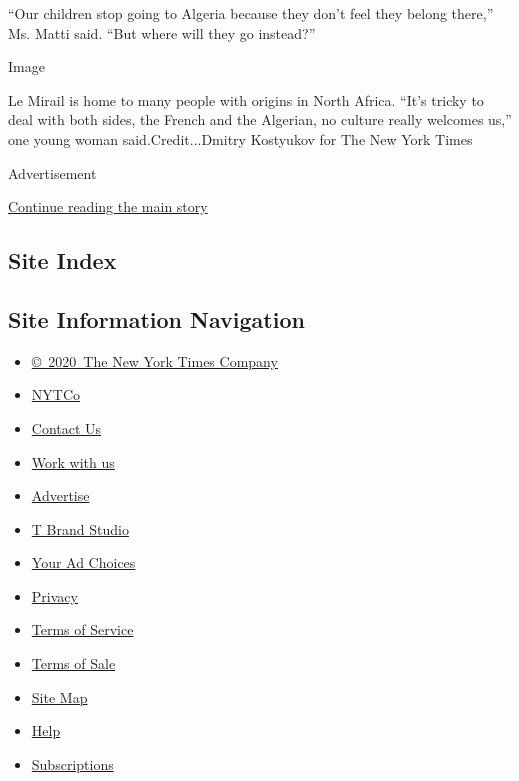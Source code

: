 ``Our children stop going to Algeria because they don't feel they belong
there,'' Ms. Matti said. ``But where will they go instead?''

Image

Le Mirail is home to many people with origins in North Africa. ``It's
tricky to deal with both sides, the French and the Algerian, no culture
really welcomes us,'' one young woman said.Credit...Dmitry Kostyukov for
The New York Times

Advertisement

\protect\hyperlink{after-bottom}{Continue reading the main story}

\hypertarget{site-index}{%
\subsection{Site Index}\label{site-index}}

\hypertarget{site-information-navigation}{%
\subsection{Site Information
Navigation}\label{site-information-navigation}}

\begin{itemize}
\tightlist
\item
  \href{https://help.nytimes3xbfgragh.onion/hc/en-us/articles/115014792127-Copyright-notice}{©~2020~The
  New York Times Company}
\end{itemize}

\begin{itemize}
\tightlist
\item
  \href{https://www.nytco.com/}{NYTCo}
\item
  \href{https://help.nytimes3xbfgragh.onion/hc/en-us/articles/115015385887-Contact-Us}{Contact
  Us}
\item
  \href{https://www.nytco.com/careers/}{Work with us}
\item
  \href{https://nytmediakit.com/}{Advertise}
\item
  \href{http://www.tbrandstudio.com/}{T Brand Studio}
\item
  \href{https://www.nytimes3xbfgragh.onion/privacy/cookie-policy\#how-do-i-manage-trackers}{Your
  Ad Choices}
\item
  \href{https://www.nytimes3xbfgragh.onion/privacy}{Privacy}
\item
  \href{https://help.nytimes3xbfgragh.onion/hc/en-us/articles/115014893428-Terms-of-service}{Terms
  of Service}
\item
  \href{https://help.nytimes3xbfgragh.onion/hc/en-us/articles/115014893968-Terms-of-sale}{Terms
  of Sale}
\item
  \href{https://spiderbites.nytimes3xbfgragh.onion}{Site Map}
\item
  \href{https://help.nytimes3xbfgragh.onion/hc/en-us}{Help}
\item
  \href{https://www.nytimes3xbfgragh.onion/subscription?campaignId=37WXW}{Subscriptions}
\end{itemize}
